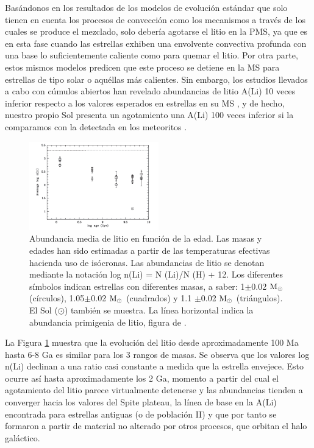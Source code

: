 Basándonos en los resultados de los modelos de evolución estándar que solo tienen en cuenta los procesos de convección como los mecanismos a través de los cuales se produce el mezclado, solo debería agotarse el litio en la PMS, ya que es en esta fase cuando las estrellas exhiben una envolvente convectiva profunda con una base lo suficientemente caliente como para quemar el litio. Por otra parte, estos mismos modelos predicen que este proceso se detiene en la MS para estrellas de tipo solar o aquéllas más calientes. Sin embargo, los estudios llevados a cabo con cúmulos abiertos han revelado abundancias de litio A(Li) 10 veces inferior respecto a los valores esperados en estrellas en su MS \citep{Sestito2005}, y de hecho, nuestro propio Sol presenta un agotamiento una A(Li) 100 veces inferior si la comparamos con la detectada en los meteoritos \citep{Lodders2003}.\par

\begin{figure}
	\centering
	\includegraphics[width=0.5\textwidth]{img/tesis/li_abundances_vs_age.pdf}
	\caption{Abundancia media de litio en función de la edad. Las masas y edades han sido estimadas a partir de las temperaturas efectivas hacienda uso de isócronas. Las abundancias de litio se denotan mediante la notación log n(Li) = N (Li)/N (H) + 12. Los diferentes símbolos indican estrellas con diferentes masas, a saber: 1$\pm$0.02 $\mathrm{M}_\odot$ (círculos), 1.05$\pm$0.02 $\mathrm{M}_\odot$ (cuadrados) y 1.1 $\pm$0.02 $\mathrm{M}_\odot$ (triángulos). El Sol ($\odot$) también se muestra. La línea horizontal indica la abundancia primigenia de litio, figura de \cite{Randich2006}.}
	\label{fig:li_abundances_vs_age}
\end{figure}

La Figura \ref{fig:li_abundances_vs_age} muestra que la evolución del litio desde aproximadamente 100 Ma hasta 6-8 Ga es similar para los 3 rangos de masas. Se observa que los valores log n(Li) declinan a una ratio casi constante a medida que la estrella envejece. Esto ocurre así hasta aproximadamente los 2 Ga, momento a partir del cual el agotamiento del litio parece virtualmente detenerse y las abundancias tienden a converger hacia los valores del Spite plateau, la línea de base en la A(Li) encontrada para estrellas antiguas (o de población II) y que por tanto se formaron a partir de material no alterado por otros procesos, que orbitan el halo galáctico. \par

